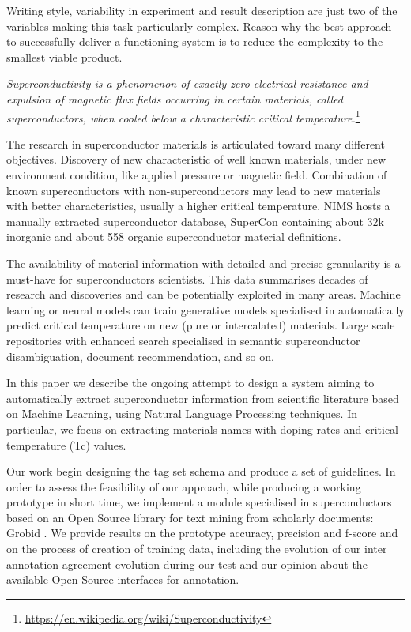 \documentclass{article}
\begin{document}
Writing style, variability in experiment and result description are just two of the variables making this task particularly complex. Reason why the best approach to successfully deliver a functioning system is to reduce the complexity to the smallest viable product.

\textit{Superconductivity is a phenomenon of exactly zero electrical resistance and expulsion of magnetic flux fields occurring in certain materials, called superconductors, when cooled below a characteristic critical temperature.}\footnote{\url{https://en.wikipedia.org/wiki/Superconductivity}}

The research in superconductor materials is articulated toward many different objectives. Discovery of new characteristic of well known materials, under new environment condition, like applied pressure or magnetic field. Combination of known superconductors with non-superconductors may lead to new materials with better characteristics, usually a higher critical temperature. 
NIMS hosts a manually extracted superconductor database,  SuperCon\cite{SuperCon} containing about 32k inorganic and about 558 organic superconductor material definitions. 

The availability of material information with detailed and precise granularity is a must-have for superconductors scientists. This data summarises decades of research and discoveries and can be potentially exploited in many areas. Machine learning or neural models can train generative models specialised in automatically predict critical temperature \cite{DBLP:journals/corr/abs-1812-01995} on new (pure or intercalated) materials. Large scale repositories with enhanced search specialised in semantic superconductor disambiguation, document recommendation, and so on. 

In this paper we describe the ongoing attempt to design a system aiming to automatically extract superconductor information from scientific literature based on Machine Learning, using Natural Language Processing techniques.
In particular, we focus on extracting materials names with doping rates and critical temperature (Tc) values.

Our work begin designing the tag set schema and produce a set of guidelines. %
In order to assess the feasibility of our approach, while producing a working prototype in short time, we implement a module specialised in superconductors based on an Open Source library for text mining from scholarly documents: Grobid \cite{GROBID} \cite{lopez2009grobid}.
We provide results on the prototype accuracy, precision and f-score and on the process of creation of training data, including the evolution of our inter annotation agreement evolution during our test and our opinion about the available Open Source interfaces for annotation. 
\end{document}
